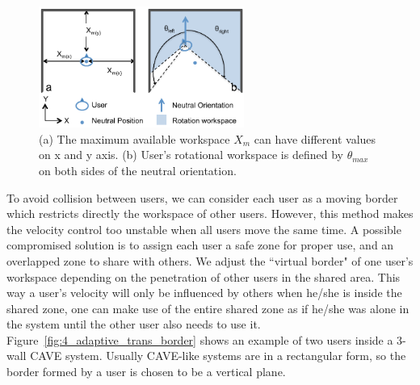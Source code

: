 \begin{figure}[tb]
\begin{center}
\includegraphics[width=0.6\textwidth]{figures/ch4/workspace_border}
\par\end{center}
\caption{\label{fig:4_workspace_border}(a) The maximum available workspace $X_{m}$ can have different values on x and y axis. (b) User's rotational workspace is defined by $\theta_{max}$ on both sides of the neutral orientation.}
\end{figure}

To avoid collision between users, we can consider each user as a moving border which restricts directly the workspace of other users. However, this method makes the velocity control too unstable when all users move the same time. A possible compromised solution is to assign each user a safe zone for proper use, and an overlapped zone to share with others. We adjust the ``virtual border" of one user's workspace depending on the penetration of other users in the shared area. This way a user's velocity will only be influenced by others when he/she is inside the shared zone, one can make use of the entire shared zone as if he/she was alone in the system until the other user also needs to use it. Figure~\ref{fig:4_adaptive_trans_border} shows an example of two users inside a 3-wall CAVE system. Usually CAVE-like systems are in a rectangular form, so the border formed by a user is chosen to be a vertical plane.

